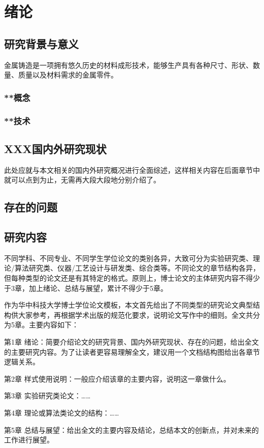 
\chapter{绪论}
\label{cha:intro}

\section{研究背景与意义}
\label{sec:general intro}

金属铸造是一项拥有悠久历史的材料成形技术，能够生产具有各种尺寸、形状、数量、质量以及材料需求的金属零件\cite{}。


\subsection{**概念}



\subsection{**技术}



\section{XXX国内外研究现状}
\label{sec:requirement}

此处应就与本文相关的国内外研究概况进行全面综述，这样相关内容在后面章节中就可以点到为止，无需再大段大段地分别介绍了。

\section{存在的问题}
\label{sec:compile}

\section{研究内容}
\label{sec:xelatex}
不同学科、不同专业、不同学生学位论文的类别各异，大致可分为实验研究类、理论/算法研究类、仪器/工艺设计与研发类、综合类等。不同论文的章节结构各异，但每种类型的论文还是有其特定的格式。原则上，博士论文的主体研究内容不得少于3章，加上绪论、总结与展望，累计不得少于5章。

作为华中科技大学博士学位论文模板，本文首先给出了不同类型的研究论文典型结构供大家参考，再根据学术出版的规范化要求，说明论文写作中的细则。全文共分为5章。主要内容如下：

第1章 绪论：简要介绍论文的研究背景、国内外研究现状、存在的问题，给出全文的主要研究内容。为了让读者更容易理解全文，建议用一个文档结构图给出各章节逻辑关系。

第2章 样式使用说明：一般应介绍该章的主要内容，说明这一章做什么。

第3章 实验研究类论文：……

第4章 理论或算法类论文的结构：……

第5章 总结与展望：给出全文的主要内容及结论，总结本文的创新点，并对未来的工作进行展望。
